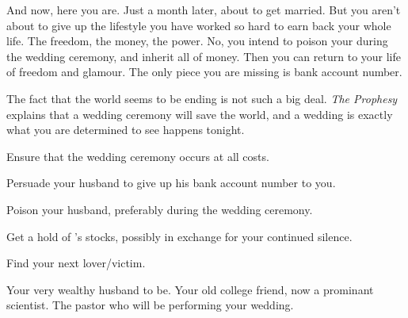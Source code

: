 \documentclass[char]{guildcamp1}
\begin{document}
And now, here you are. Just a month later, about to get married. But you aren't about to give up the lifestyle you have worked so hard to earn back your whole life. The freedom, the money, the power. No, you intend to poison your \cGroomA{\spouse} during the wedding ceremony, and inherit all of \cGroomA{\their} money. Then you can return to your life of freedom and glamour.  The only piece you are missing is \cGroomA{\their} bank account number. 

The fact that the world seems to be ending is not such a big deal. {\em The Prophesy} explains that a wedding ceremony will save the world, and a wedding is exactly what you are determined to see happens tonight.

\begin{itemz}[Goals]
  \item Ensure that the wedding ceremony occurs at all costs.
  \item Persuade your husband to give up his bank account number to you.
  \item Poison your husband, preferably during the wedding ceremony.
  \item Get a hold of \cRival{}'s stocks, possibly in exchange for your continued silence.
  \item Find your next lover/victim.
\end{itemz}

\begin{contacts}
  \contact{\cGroomA{}} Your very wealthy husband to be. 
  \contact{\cRival{}} Your old college friend, now a prominant scientist.
  \contact{\cPastor{}} The pastor who will be performing your wedding.
\end{contacts}
\end{document}
